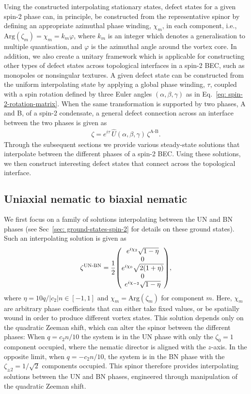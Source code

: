 Using the constructed interpolating stationary states, defect states for a given
spin-2 phase can, in principle, be constructed from
the representative spinor by defining an appropriate azimuthal phase winding,
\(\chi_m \), in each component, i.e., \(\text{Arg}(\zeta_m) =\chi_m =
k_m\varphi \), where \(k_m\) is an integer which denotes a generalisation to
multiple quantisation, and \(\varphi \) is the azimuthal angle around the vortex
core.
In addition, we also create a unitary framework which is applicable for
constructing other types of defect states across topological interfaces in a
spin-2 BEC, such as monopoles or nonsingular textures.
A given defect state can be constructed from the uniform interpolating state by
applying a global phase winding, \(\tau \), coupled with a spin rotation defined
by three Euler angles \((\alpha, \beta, \gamma)\) as in
Eq.~\eqref{eq: spin-2-rotation-matrix}.
When the same transformation is supported by two phases, A and B, of a spin-2
condensate, a general defect connection across an interface between the two
phases is given as
\begin{align}\label{eq: general-defect-interface}
    \zeta = e^{i\tau}\,\hat{U}(\alpha, \beta, \gamma)\,\zeta^\text{A-B}.
\end{align}
Through the subsequent sections we provide various steady-state solutions that
interpolate between the different phases of a spin-2 BEC.\@
Using these solutions, we then construct interesting defect states that connect
across the topological interface.

\subsection{Uniaxial nematic to biaxial nematic}\label{subsec: UN-BN-defects}
We first focus on a family of solutions interpolating between the UN and BN
phases (see Sec~\ref{sec: ground-states-spin-2} for details on these ground
states).
Such an interpolating solution is given as
\begin{align}\label{eq: UN-BN-interpolating-spinor}
    \zeta^\text{UN-BN} = \frac{1}{2}\mqty(
    e^{i\chi_2}\sqrt{1 - \eta} \\
    0 \\
    e^{i\chi_0}\sqrt{2(1+\eta)} \\
    0 \\
    e^{i\chi_{-2}}\sqrt{1 - \eta}
    ),
\end{align}
where \(\eta = 10q /|c_2|n \in [-1, 1]\) and \(\chi_m = \text{Arg}(\zeta_m)\)
for component \(m\).
Here, \(\chi_m\) are arbitrary phase coefficients that can either take fixed
values, or be spatially wound in order to produce different vortex states.
This solution depends only on the quadratic Zeeman shift, which can alter the
spinor between the different phases: When \(q = c_2n / 10\) the system is in the
UN phase with only the \(\zeta_0=1\) component occupied, where the nematic
director is aligned with the \(z\)-axis.
In the opposite limit, when \(q = -c_2n/10\), the system is in the
BN phase with the \(\zeta_{\pm 2} = 1/\sqrt{2}\) components occupied.
This spinor therefore provides interpolating solutions between the UN and BN
phases, engineered through manipulation of the quadratic Zeeman shift.

